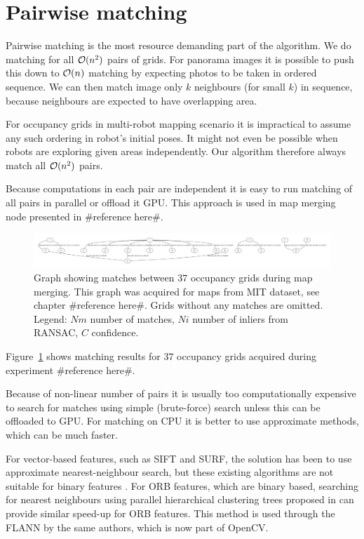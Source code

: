 
\section{Pairwise matching} %
\label{sec:pairwisematching}

Pairwise matching is the most resource demanding part of the algorithm. We do matching for all $\operatorname{\mathcal{O}}(n^2)$ pairs of grids. For panorama images it is possible to push this down to $\operatorname{\mathcal{O}}(n)$ matching by expecting photos to be taken in ordered sequence. We can then match image only $k$ neighbours (for small $k$) in sequence, because neighbours are expected to have overlapping area.

For occupancy grids in multi-robot mapping scenario it is impractical to assume any such ordering in robot's initial poses. It might not even be possible when robots are exploring given areas independently. Our algorithm therefore always match all $\operatorname{\mathcal{O}}(n^2)$ pairs.

Because computations in each pair are independent it is easy to run matching of all pairs in parallel or offload it GPU. This approach is used in map merging node presented in \#reference here\#.

\begin{figure}
    \centering
    \includegraphics[width=\textwidth]{../img/matches.pdf}
    \caption{Graph showing matches between $37$ occupancy grids during map merging. This graph was acquired for maps from MIT dataset, see chapter \#reference here\#. Grids without any matches are omitted. Legend: $Nm$ number of matches, $Ni$ number of inliers from \gls{RANSAC}, $C$ confidence.}
    \label{fig:matches}
\end{figure}

Figure~\ref{fig:matches} shows matching results for $37$ occupancy grids acquired during experiment \#reference here\#.

Because of non-linear number of pairs it is usually too computationally expensive to search for matches using simple (brute-force) search unless this can be offloaded to GPU. For matching on CPU it is better to use approximate methods, which can be much faster.

For vector-based features, such as \gls{SIFT} and \gls{SURF}, the solution has been to use approximate nearest-neighbour search, but these existing algorithms are not suitable for binary features \cite{Muja2012}. For \gls{ORB} features, which are binary based, searching for nearest neighbours using parallel hierarchical clustering trees proposed in \cite{Muja2012} can provide similar speed-up for \gls{ORB} features. This method is used through the \gls{FLANN} by the same authors, which is now part of \gls{OpenCV}.

